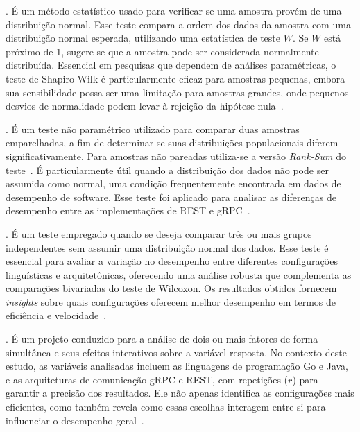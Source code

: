 .
{É um método estatístico usado para verificar se uma amostra provém de uma distribuição normal.
Esse teste compara a ordem dos dados da amostra com uma distribuição normal esperada, utilizando uma estatística de teste $W$. Se $W$ está próximo de 1, sugere-se que a amostra pode ser considerada normalmente distribuída.
Essencial em pesquisas que dependem de análises paramétricas, o teste de Shapiro-Wilk é particularmente eficaz para amostras pequenas, embora sua sensibilidade possa ser uma limitação para amostras grandes, onde pequenos desvios de normalidade podem levar à rejeição da hipótese nula~\cite{miot_2017}.}
\vspace{4pt}

.
É um teste não paramétrico utilizado para comparar duas amostras emparelhadas, a fim de determinar se suas distribuições populacionais diferem significativamente. Para amostras não pareadas utiliza-se a versão \textit{Rank-Sum} do teste~\cite{wilRank}. É particularmente útil quando a distribuição dos dados não pode ser assumida como normal, uma condição frequentemente encontrada em dados de desempenho de software. Esse teste foi aplicado para analisar as diferenças de desempenho entre as implementações de REST e gRPC~\cite{Pokropp1992}.
\vspace{4pt}

. 
É um teste empregado quando se deseja comparar três ou mais grupos independentes sem assumir uma distribuição normal dos dados. Esse teste é essencial para avaliar a variação no desempenho entre diferentes configurações linguísticas e arquitetônicas, oferecendo uma análise robusta que complementa as comparações bivariadas do teste de Wilcoxon. Os resultados obtidos fornecem {\em insights} sobre quais configurações oferecem melhor desempenho em termos de eficiência e velocidade~\cite{Habibzadeh2024}.
\vspace{4pt}

.
É um projeto conduzido para a análise de dois ou mais fatores de forma simultânea e seus efeitos interativos sobre a variável resposta. No contexto deste estudo, as variáveis analisadas incluem as linguagens de programação Go e Java, e as arquiteturas de comunicação gRPC e REST, com repetições ($r$) para garantir a precisão dos resultados. Ele não apenas identifica as configurações mais eficientes, como também revela como essas escolhas interagem entre si para influenciar o desempenho geral~\cite{jain1991}.

